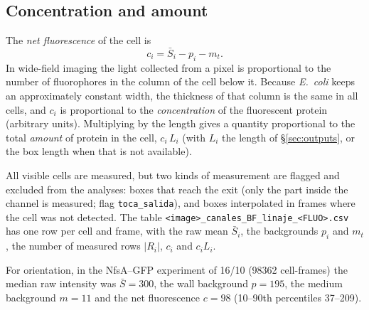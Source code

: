 \documentclass[11pt,a4paper]{article}
\begin{document}
\subsection{Concentration and amount}
The \emph{net fluorescence} of the cell is
\begin{equation}
c_i=\bar S_i-p_i-m_t .
\end{equation}
In wide-field imaging the light collected from a pixel is proportional to the number of fluorophores in the column of the cell below it. Because \emph{E.~coli} keeps an approximately constant width, the thickness of that column is the same in all cells, and $c_i$ is proportional to the \emph{concentration} of the fluorescent protein (arbitrary units). Multiplying by the length gives a quantity proportional to the total \emph{amount} of protein in the cell, $c_i\,L_i$ (with $L_i$ the length of \S\ref{sec:outputs}, or the box length when that is not available).

All visible cells are measured, but two kinds of measurement are flagged and excluded from the analyses: boxes that reach the exit (only the part inside the channel is measured; flag \texttt{toca\_salida}), and boxes interpolated in frames where the cell was not detected.
The table \texttt{<image>\_canales\_BF\_linaje\_<FLUO>.csv} has one row per cell and frame, with the raw mean $\bar S_i$, the backgrounds $p_i$ and $m_t$, the number of measured rows $|R_i|$, $c_i$ and $c_i L_i$.

For orientation, in the NfsA--GFP experiment of 16/10 (\num{98362} cell-frames) the median raw intensity was $\bar S=300$, the wall background $p=195$, the medium background $m=11$ and the net fluorescence $c=98$ (10--90th percentiles 37--209).
\end{document}
